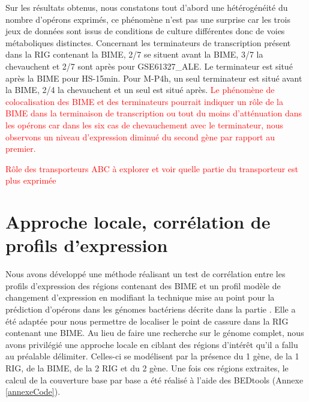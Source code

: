 \documentclass[12pt,a4paper]{report}
\begin{document}
\begin{onehalfspace}
Sur les résultats obtenus, nous constatons tout d'abord une hétérogénéité du nombre d'opérons exprimés, ce phénomène n'est pas une surprise car les trois jeux de données sont issus de conditions de culture différentes donc de voies métaboliques distinctes. Concernant les terminateurs de transcription présent dans la RIG contenant la BIME, 2/7 se situent avant la BIME, 3/7 la chevauchent et 2/7 sont après pour GSE61327\_ALE. Le terminateur est situé après la BIME pour HS-15min. Pour M-P4h, un seul terminateur est situé avant la BIME, 2/4 la chevauchent et un seul est situé après. \textcolor{red}{Le phénomène de colocalisation des BIME et des terminateurs pourrait indiquer un rôle de la BIME dans la terminaison de transcription ou tout du moins d'atténuation dans les opérons car dans les six cas de chevauchement avec le terminateur, nous observons un niveau d'expression diminué du second gène par rapport au premier.}

\textcolor{red}{Rôle des transporteurs ABC à explorer et voir quelle partie du transporteur est plus exprimée}

\section*{Approche locale, corrélation de profils d'expression}
\label{approche_locale}
Nous avons développé une méthode réalisant un test de corrélation entre les profils d'expression des régions contenant des BIME et un profil modèle de changement d'expression en modifiant la technique mise au point pour la prédiction d'opérons dans les génomes bactériens \citep{Fortino2014} décrite dans la partie . Elle a été adaptée pour nous permettre de localiser le point de cassure dans la RIG contenant une BIME. Au lieu de faire une recherche sur le génome complet, nous avons privilégié une approche locale en ciblant des régions d'intérêt qu'il a fallu au préalable délimiter. Celles-ci se modélisent par la présence du 1 gène, de la 1 RIG, de la BIME, de la 2 RIG et du 2 gène. Une fois ces régions extraites, le calcul de la couverture base par base a été réalisé à l'aide des BEDtools (Annexe \ref{annexeCode}).




\end{onehalfspace}
\end{document}
